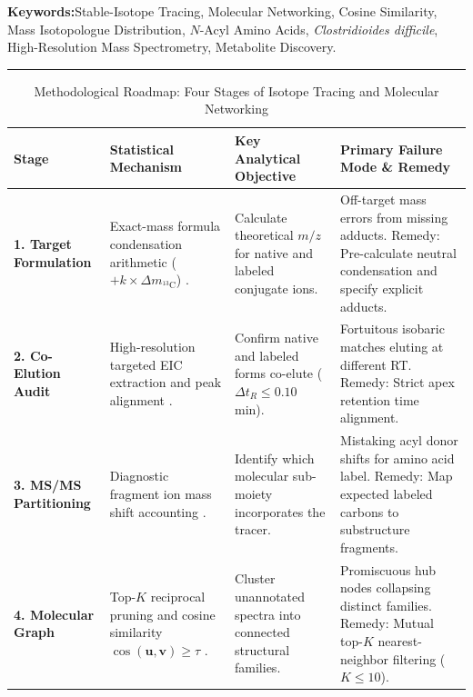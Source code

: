 \documentclass[11pt,twoside,openright]{book}
\begin{document}
\noindent
\textbf{Keywords:}\enspace Stable-Isotope Tracing, Molecular Networking, Cosine Similarity, Mass Isotopologue Distribution, $N$-Acyl Amino Acids, \textit{Clostridioides difficile}, High-Resolution Mass Spectrometry, Metabolite Discovery.

\vspace{0.8em}
\noindent\rule{\textwidth}{0.4pt}


\begin{table}[ht]
\centering
\caption{Methodological Roadmap: Four Stages of Isotope Tracing and Molecular Networking}
\label{tab:tracing_roadmap}
\small
\begin{tabularx}{\textwidth}{l p{3.8cm} p{4.2cm} X}
\toprule
\textbf{Stage} & \textbf{Statistical Mechanism} & \textbf{Key Analytical Objective} & \textbf{Primary Failure Mode \& Remedy} \\
\midrule
\textbf{1. Target Formulation} & Exact-mass formula condensation arithmetic ($+k \times \Delta m_{^{13}\text{C}}$) \cite{hsieh2026aromatic, rainer2022modular}. & Calculate theoretical $m/z$ for native and labeled conjugate ions. & Off-target mass errors from missing adducts. Remedy: Pre-calculate neutral condensation and specify explicit adducts. \\
\addlinespace
\textbf{2. Co-Elution Audit} & High-resolution targeted EIC extraction and peak alignment \cite{buescher2015roadmap, wade1999deuterium}. & Confirm native and labeled forms co-elute ($\Delta t_R \le 0.10$ min). & Fortuitous isobaric matches eluting at different RT. Remedy: Strict apex retention time alignment. \\
\addlinespace
\textbf{3. MS/MS Partitioning} & Diagnostic fragment ion mass shift accounting \cite{duehrkop2019sirius, millard2012isocor, su2017accucor}. & Identify which molecular sub-moiety incorporates the tracer. & Mistaking acyl donor shifts for amino acid label. Remedy: Map expected labeled carbons to substructure fragments. \\
\addlinespace
\textbf{4. Molecular Graph} & Top-$K$ reciprocal pruning and cosine similarity $\cos(\mathbf{u}, \mathbf{v}) \ge \tau$ \cite{wang2016sharing, nothias2020feature, csardi2006igraph, stein1994optimization}. & Cluster unannotated spectra into connected structural families. & Promiscuous hub nodes collapsing distinct families. Remedy: Mutual top-$K$ nearest-neighbor filtering ($K \le 10$). \\
\bottomrule
\end{tabularx}
\end{table}
\end{document}
